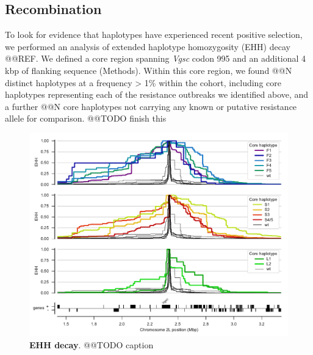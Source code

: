 \documentclass[a4paper,11pt,abstracton,hidelinks]{scrartcl}
\begin{document}
\subsection*{Recombination}


To look for evidence that haplotypes have experienced recent positive selection, we performed an analysis of extended haplotype homozygosity (EHH) decay @@REF.
%
We defined a core region spanning \textit{Vgsc} codon 995 and an additional 4 kbp of flanking sequence (Methods).
%
Within this core region, we found @@N distinct haplotypes at a frequency > 1\% within the cohort, including core haplotypes representing each of the resistance outbreaks we identified above, and a further @@N core haplotypes not carrying any known or putative resistance allele for comparison.
%
@@TODO finish this

%
\begin{figure}[!b]
  \includegraphics[width=1.1\linewidth,center]{artwork/ehh_decay.pdf}
  \caption{\textbf{EHH decay}. @@TODO caption}
  \label{fig:ehh_decay}
\end{figure}
\end{document}
